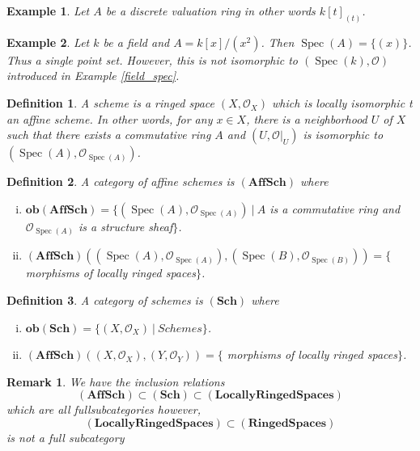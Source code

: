 \documentclass{article}
\newtheorem{definition}{Definition}[section]
\newtheorem{remark}{Remark}[section]
\newtheorem{example}{Example}[section]
\numberwithin{equation}{section}
\DeclareMathOperator{\Spec}{Spec}
\begin{document}
\begin{example}
Let $A$ be a discrete valuation ring in other words $k[t]_{(t)}$. 
\end{example}

\begin{example}
Let $k$ be a field and $A=k[x]/(x^2)$. Then $\Spec(A)=\{(x)\}$. Thus a single point set. However, this is not isomorphic to $(\Spec(k),\mathcal{O})$ introduced in Example \ref{field_spec}.
\end{example}

\begin{definition}
A scheme is a ringed space $(X,\mathcal{O}_X)$ which is locally isomorphic t an affine scheme. In other words, for any $x\in X$, there is a neighborhood $U$ of $X$ such that there exists a commutative ring $A$ and $(U,\mathcal{O}|_U)$ is isomorphic to $(\Spec(A), \mathcal{O}_{\Spec(A)})$.
\end{definition}

\begin{definition}
A category of affine schemes is $(\mathbf{AffSch})$ where
\begin{enumerate}[i).]
\item $\mathbf{ob}(\mathbf{AffSch}) = \{(\Spec(A),\mathcal{O}_{\Spec(A)})\:|\: A$ is a commutative ring and $\mathcal{O}_{\Spec(A)}$ is a structure sheaf$\}$.
\item $(\mathbf{AffSch})((\Spec(A),\mathcal{O}_{\Spec(A)}),(\Spec(B),\mathcal{O}_{\Spec(B)})) =\{$ morphisms of locally ringed spaces$\}$.
\end{enumerate}
\end{definition}

\begin{definition}
A category of schemes is $(\mathbf{Sch})$ where 
\begin{enumerate}[i).]
\item $\mathbf{ob}(\mathbf{Sch}) = \{(X,\mathcal{O}_X)\:|\: Schemes\}$.
\item $(\mathbf{AffSch})((X,\mathcal{O}_X),(Y,\mathcal{O}_Y)) =\{$ morphisms of locally ringed spaces$\}$.
\end{enumerate}
\end{definition}


\begin{remark}
We have the inclusion relations
\begin{equation*}
(\mathbf{AffSch})\subset(\mathbf{Sch})\subset(\mathbf{Locally Ringed Spaces})
\end{equation*}
which are all fullsubcategories however, 
\begin{equation*}
(\mathbf{Locally Ringed Spaces})\subset(\mathbf{Ringed Spaces})
\end{equation*}
is not a full subcategory
\end{remark}
\end{document}
